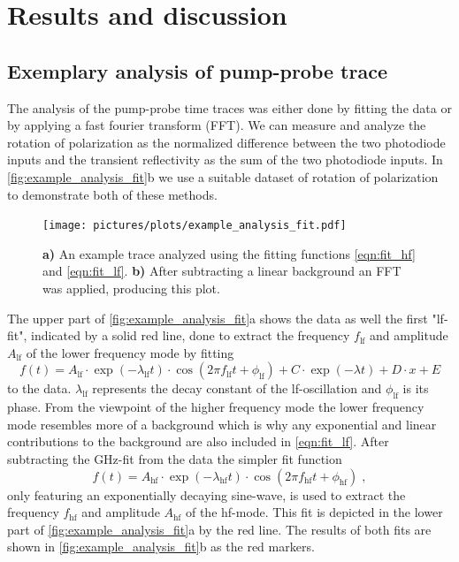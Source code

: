 \chapter{Results and discussion}
\section{Exemplary analysis of pump-probe trace}
The analysis of the pump-probe time traces was either done by fitting the data or by applying a fast fourier transform (FFT).
We can measure and analyze the rotation of polarization as the normalized difference between the two photodiode inputs and the transient reflectivity as the sum of the two photodiode inputs.
In \autoref{fig:example_analysis_fit}b we use a suitable dataset of rotation of polarization to demonstrate both of these methods.
\begin{figure}[ht]
    \centering
    \texttt{[image: pictures/plots/example\_analysis\_fit.pdf]}
    \caption{\textbf{a)} An example trace analyzed using the fitting functions \autoref{eqn:fit_hf} and \autoref{eqn:fit_lf}. \textbf{b)} After subtracting a linear background an FFT was applied, producing this plot.}
    \label{fig:example_analysis_fit}
\end{figure}
\FloatBarrier
The upper part of \autoref{fig:example_analysis_fit}a shows the data as well the first "lf-fit", indicated by a solid red line, done to extract the frequency $f_{\text{lf}}$ and amplitude $A_{\text{lf}}$ of the lower frequency mode by fitting
\begin{equation}
    f(t) = A_{\text{lf}} \cdot \exp(-\lambda_{\text{lf}} t) \cdot \cos(2 \pi f_{\text{lf}} t + \phi_{\text{lf}}) + C \cdot \exp(-\lambda t) + D \cdot x + E
    \label{eqn:fit_lf}
\end{equation}
to the data.
$\lambda_{\text{lf}}$ represents the decay constant of the lf-oscillation and $\phi_{\text{lf}}$ is its phase.
From the viewpoint of the higher frequency mode the lower frequency mode resembles more of a background which is why any exponential and linear contributions to the background are also included in \autoref{eqn:fit_lf}.
After subtracting the GHz-fit from the data the simpler fit function
\begin{equation}
    f(t) = A_{\text{hf}} \cdot \exp(-\lambda_{\text{hf}} t) \cdot \cos(2 \pi f_{\text{hf}} t + \phi_{\text{hf}}) \;,
    \label{eqn:fit_hf}
\end{equation}
only featuring an exponentially decaying sine-wave, is used to extract the frequency $f_{\text{hf}}$ and amplitude $A_{\text{hf}}$ of the hf-mode.
This fit is depicted in the lower part of \autoref{fig:example_analysis_fit}a by the red line.
The results of both fits are shown in \autoref{fig:example_analysis_fit}b as the red markers.

